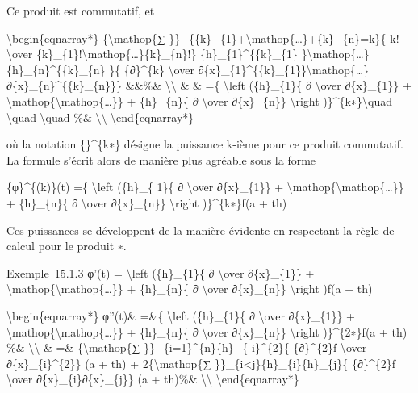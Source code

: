 \documentclass[]{article}
\begin{document}
Ce produit est commutatif, et

\textbackslash{}begin\{eqnarray*\} \{\textbackslash{}mathop\{∑
\}\}\_\{\{k\}\_\{1\}+\textbackslash{}mathop\{\ldots{}\}+\{k\}\_\{n\}=k\}\{
k! \textbackslash{}over
\{k\}\_\{1\}!\textbackslash{}mathop\{\ldots{}\}\{k\}\_\{n\}!\}
\{h\}\_\{1\}\^{}\{\{k\}\_\{1\}
\}\textbackslash{}mathop\{\ldots{}\}\{h\}\_\{n\}\^{}\{\{k\}\_\{n\} \}\{
\{∂\}\^{}\{k\} \textbackslash{}over
∂\{x\}\_\{1\}\^{}\{\{k\}\_\{1\}\}\textbackslash{}mathop\{\ldots{}\}∂\{x\}\_\{n\}\^{}\{\{k\}\_\{n\}\}\}
\&\&\%\& \textbackslash{}\textbackslash{} \& \& =\{ \textbackslash{}left
(\{h\}\_\{1\}\{ ∂ \textbackslash{}over ∂\{x\}\_\{1\}\} +
\textbackslash{}mathop\{\textbackslash{}mathop\{\ldots{}\}\} +
\{h\}\_\{n\}\{ ∂ \textbackslash{}over ∂\{x\}\_\{n\}\}
\textbackslash{}right )\}\^{}\{k∗\}\textbackslash{}quad
\textbackslash{}quad \textbackslash{}quad \%\&
\textbackslash{}\textbackslash{} \textbackslash{}end\{eqnarray*\}

où la notation \{\}\^{}\{k∗\} désigne la puissance k-ième pour ce
produit commutatif. La formule s'écrit alors de manière plus agréable
sous la forme

\{φ\}\^{}\{(k)\}(t) =\{ \textbackslash{}left (\{h\}\_\{ 1\}\{ ∂
\textbackslash{}over ∂\{x\}\_\{1\}\} +
\textbackslash{}mathop\{\textbackslash{}mathop\{\ldots{}\}\} +
\{h\}\_\{n\}\{ ∂ \textbackslash{}over ∂\{x\}\_\{n\}\}
\textbackslash{}right )\}\^{}\{k∗\}f(a + th)

Ces puissances se développent de la manière évidente en respectant la
règle de calcul pour le produit ∗.

Exemple~15.1.3 φ'(t) = \textbackslash{}left (\{h\}\_\{1\}\{ ∂
\textbackslash{}over ∂\{x\}\_\{1\}\} +
\textbackslash{}mathop\{\textbackslash{}mathop\{\ldots{}\}\} +
\{h\}\_\{n\}\{ ∂ \textbackslash{}over ∂\{x\}\_\{n\}\}
\textbackslash{}right )f(a + th)

\textbackslash{}begin\{eqnarray*\} φ''(t)\& =\&\{ \textbackslash{}left
(\{h\}\_\{1\}\{ ∂ \textbackslash{}over ∂\{x\}\_\{1\}\} +
\textbackslash{}mathop\{\textbackslash{}mathop\{\ldots{}\}\} +
\{h\}\_\{n\}\{ ∂ \textbackslash{}over ∂\{x\}\_\{n\}\}
\textbackslash{}right )\}\^{}\{2∗\}f(a + th) \%\&
\textbackslash{}\textbackslash{} \& =\& \{\textbackslash{}mathop\{∑
\}\}\_\{i=1\}\^{}\{n\}\{h\}\_\{ i\}\^{}\{2\}\{ \{∂\}\^{}\{2\}f
\textbackslash{}over ∂\{x\}\_\{i\}\^{}\{2\}\} (a + th) +
2\{\textbackslash{}mathop\{∑
\}\}\_\{i\textless{}j\}\{h\}\_\{i\}\{h\}\_\{j\}\{ \{∂\}\^{}\{2\}f
\textbackslash{}over ∂\{x\}\_\{i\}∂\{x\}\_\{j\}\} (a + th)\%\&
\textbackslash{}\textbackslash{} \textbackslash{}end\{eqnarray*\}
\end{document}
